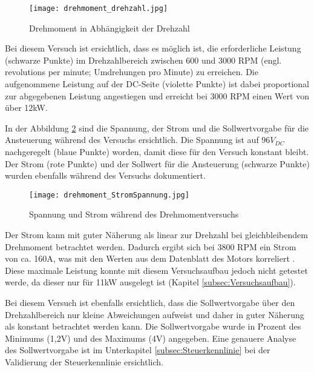 \begin{figure}[H]
	\centering
	\texttt{[image: drehmoment\_drehzahl.jpg]}
	\caption{Drehmoment in Abhängigkeit der Drehzahl}\label{fig:drehmoment/drehzahl}
\end{figure}

Bei diesem Versuch ist ersichtlich, dass es möglich ist, die erforderliche Leistung (schwarze Punkte) im Drehzahlbereich zwischen 600 und 3000 RPM (engl. revolutions per minute; \glqq Umdrehungen pro Minute\grqq) zu erreichen. Die aufgenommene Leistung auf der DC-Seite (violette Punkte) ist dabei proportional zur abgegebenen Leistung angestiegen und erreicht bei 3000 RPM einen Wert von über 12kW.

\newpage

In der Abbildung \ref{fig:drehmoment/StromSpannung} sind die Spannung, der Strom und die Sollwertvorgabe für die Ansteuerung während des Versuchs ersichtlich. Die Spannung ist auf $96V_{DC}$ nachgeregelt (blaue Punkte) worden, damit diese für den Versuch konstant bleibt. Der Strom (rote Punkte) und der Sollwert für die Ansteuerung (schwarze Punkte) wurden ebenfalls während des Versuchs dokumentiert.


\begin{figure}[H]
	\centering
	\texttt{[image: drehmoment\_StromSpannung.jpg]}
	\caption{Spannung und Strom während des Drehmomentversuchs}\label{fig:drehmoment/StromSpannung}
\end{figure}

Der Strom kann mit guter Näherung als linear zur Drehzahl bei gleichbleibendem Drehmoment betrachtet werden. Dadurch ergibt sich bei 3800 RPM ein Strom von ca. 160A, was mit den Werten aus dem Datenblatt des Motors korreliert \cite{MotorData}. Diese maximale Leistung konnte mit diesem Versuchsaufbau jedoch nicht getestet werde, da dieser nur für 11kW ausgelegt ist (Kapitel \ref{subsec:Versuchsaufbau}).

Bei diesem Versuch ist ebenfalls ersichtlich, dass die Sollwertvorgabe über den Drehzahlbereich nur kleine Abweichungen aufweist und daher in guter Näherung als konstant betrachtet werden kann. Die Sollwertvorgabe wurde in Prozent des Minimums (1,2V) und des Maximums (4V) angegeben. Eine genauere Analyse des Sollwertvorgabe ist im Unterkapitel \ref{subsec:Steuerkennlinie} bei der Validierung der Steuerkennlinie ersichtlich.
